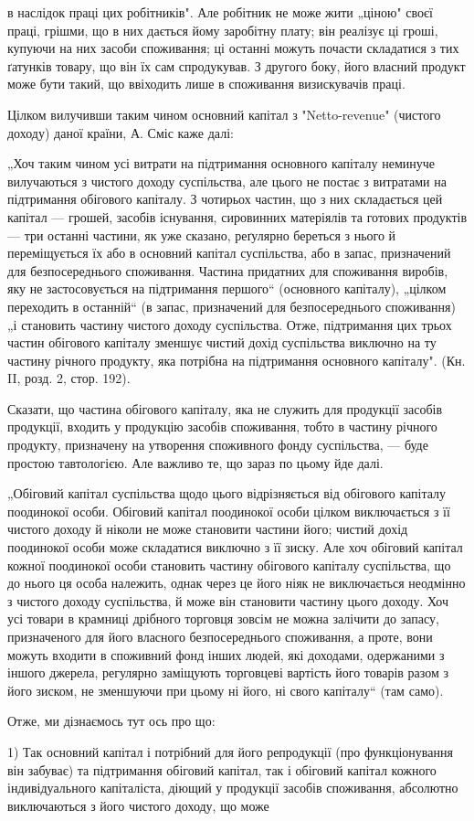\parcont{}  %
в наслідок праці цих робітників". Але робітник не може жити „ціною"
своєї праці, грішми, що в них дається йому заробітну плату; він реалізує
ці гроші, купуючи на них засоби споживання; ці останні можуть
почасти складатися з тих ґатунків товару, що він їх сам спродукував.
З другого боку, його власний продукт може бути такий, що ввіходить
лише в споживання визискувачів праці.

Цілком вилучивши таким чином основний капітал з "Netto-revenue"
(чистого доходу) даної країни, А. Сміс каже далі:

„Хоч таким чином усі витрати на підтримання основного капіталу
неминуче вилучаються з чистого доходу суспільства, але цього не постає
з витратами на підтримання обігового капіталу. З чотирьох частин, що
з них складається цей капітал — грошей, засобів існування, сировинних
матеріялів та готових продуктів — три останні частини, як уже сказано,
реґулярно береться з нього й переміщується їх або в основний капітал
суспільства, або в запас, призначений для безпосереднього споживання.
Частина придатних для споживання виробів, яку не застосовується на
підтримання першого“ (основного капіталу), „цілком переходить в останній“
(в запас, призначений для безпосереднього споживання) „і становить
частину чистого доходу суспільства. Отже, підтримання цих трьох
частин обігового капіталу зменшує чистий дохід суспільства виключно
на ту частину річного продукту, яка потрібна на підтримання основного
капіталу". (Кн. II, розд. 2, стор. 192).

Сказати, що частина обігового капіталу, яка не служить для продукції
засобів продукції, входить у продукцію засобів споживання, тобто в частину
річного продукту, призначену на утворення споживного фонду
суспільства, — буде простою тавтологією. Але важливо те, що зараз по
цьому йде далі.

„Обіговий капітал суспільства щодо цього відрізняється від обігового
капіталу поодинокої особи. Обіговий капітал поодинокої особи цілком
виключається з її чистого доходу й ніколи не може становити частини
його; чистий дохід поодинокої особи може складатися виключно з її
зиску. Але хоч обіговий капітал кожної поодинокої особи становить
частину обігового капіталу суспільства, що до нього ця особа належить,
однак через це його ніяк не виключається неодмінно з чистого доходу
суспільства, й може він становити частину цього доходу. Хоч усі товари
в крамниці дрібного торговця зовсім не можна залічити до запасу, призначеного
для його власного безпосереднього споживання, а проте, вони
можуть входити в споживний фонд інших людей, які доходами, одержаними
з іншого джерела, регулярно заміщують торговцеві вартість його
товарів разом з його зиском, не зменшуючи при цьому ні його, ні свого
капіталу“ (там само).

Отже, ми дізнаємось тут ось про що:

1) Так основний капітал і потрібний для його репродукції (про функціонування
він забуває) та підтримання обіговий капітал, так і обіговий
капітал кожного індивідуального капіталіста, діющий у продукції засобів
споживання, абсолютно виключаються з його чистого доходу, що може
\parbreak{}  %
